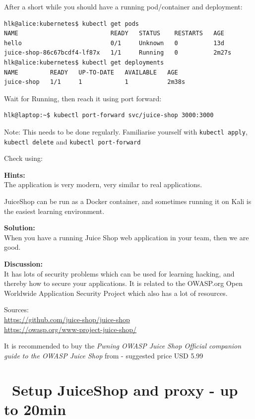 \documentclass[a4paper,11pt,notitlepage]{report}
\begin{document}
\eject
After a short while you should have a running pod/container and deployment:
\begin{verbatim}
hlk@alice:kubernetes$ kubectl get pods
NAME                          READY   STATUS    RESTARTS   AGE
hello                         0/1     Unknown   0          13d
juice-shop-86c67bcdf4-lf87x   1/1     Running   0          2m27s
hlk@alice:kubernetes$ kubectl get deployments
NAME         READY   UP-TO-DATE   AVAILABLE   AGE
juice-shop   1/1     1            1           2m38s
\end{verbatim}


Wait for Running, then reach it using port forward:
\begin{verbatim}
hlk@laptop:~$ kubectl port-forward svc/juice-shop 3000:3000
\end{verbatim}


Note: This needs to be done regularly. Familiarise yourself with \verb+kubectl apply+, \verb+kubectl delete+ and \verb+kubectl port-forward+


Check using: 

{\bf Hints:}\\
The application is very modern, very similar to real applications.

JuiceShop can be run as a Docker container, and sometimes running it on Kali is the easiest learning environment.

{\bf Solution:}\\
When you have a running Juice Shop web application in your team, then we are good.

{\bf Discussion:}\\
It has lots of security problems which can be used for learning
hacking, and thereby how to secure your applications. It is related
to the OWASP.org Open Worldwide Application Security Project which also has a
lot of resources.

Sources:\\
\url{https://github.com/juice-shop/juice-shop}\\
\url{https://owasp.org/www-project-juice-shop/}


It is recommended to buy the \emph{Pwning OWASP Juice Shop Official companion guide to the OWASP Juice Shop} from  - suggested price USD 5.99



\chapter{\faInfoCircle\ Setup JuiceShop and proxy - up to 20min}
\label{ex:js-burp}
\end{document}

